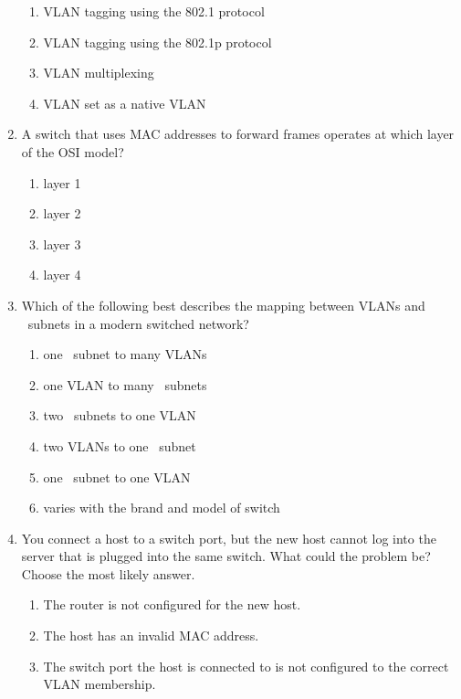 \begin{enumerate}
   \begin{enumerate}
      \item \acs{VLAN} tagging using the 802.1 protocol
      \item \acs{VLAN} tagging using the 802.1p protocol
      \item \acs{VLAN} multiplexing
      \item \acs{VLAN} set as a native \acs{VLAN}
   \end{enumerate}
\item
   A switch that uses \acs{MAC} addresses to forward frames operates at which layer of the \acs{OSI} model?
   \begin{multicols}{2}
   \begin{enumerate}
   \item layer 1
   \item layer 2
   \item layer 3
   \item layer 4
   \end{enumerate}
   \end{multicols}
\item
   Which of the following best describes the mapping between \acsp{VLAN} and \IP\ subnets in a modern switched network?
   \begin{enumerate}
   \item one \IP\ subnet to many \acsp{VLAN}
   \item one \acs{VLAN} to many \IP\ subnets
   \item two \IP\ subnets to one \acs{VLAN}
   \item two \acsp{VLAN} to one \IP\ subnet
   \item one \IP\ subnet to one \acs{VLAN}
   \item varies with the brand and model of switch
   \end{enumerate}
\item
   You connect a host to a switch port, but the new host cannot log into the server that is plugged into the same switch.
   What could the problem be?
   Choose the most likely answer.
   \begin{enumerate}
   \item The router is not configured for the new host.
   \item The host has an invalid \acs{MAC} address.
   \item The switch port the host is connected to is not configured to the correct \acs{VLAN} membership.
   \end{enumerate}
\end{enumerate}



